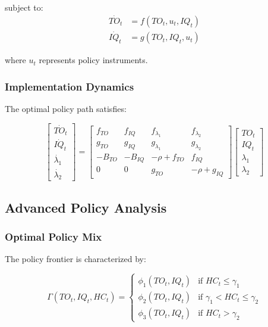 \documentclass[12pt,a4paper]{article}
\theoremstyle{definition}
\begin{document}
subject to:
\begin{align}
\dot{TO_t} &= f(TO_t, u_t, IQ_t) \\
\dot{IQ_t} &= g(TO_t, IQ_t, u_t)
\end{align}

where $u_t$ represents policy instruments.

\subsubsection{Implementation Dynamics}
The optimal policy path satisfies:

\begin{equation}
\begin{bmatrix}
\dot{TO_t} \\
\dot{IQ_t} \\
\dot{\lambda_1} \\
\dot{\lambda_2}
\end{bmatrix} = 
\begin{bmatrix}
f_{TO} & f_{IQ} & f_{\lambda_1} & f_{\lambda_2} \\
g_{TO} & g_{IQ} & g_{\lambda_1} & g_{\lambda_2} \\
-B_{TO} & -B_{IQ} & -\rho+f_{TO} & f_{IQ} \\
0 & 0 & g_{TO} & -\rho+g_{IQ}
\end{bmatrix}
\begin{bmatrix}
TO_t \\
IQ_t \\
\lambda_1 \\
\lambda_2
\end{bmatrix}
\end{equation}

\subsection{Advanced Policy Analysis}
\subsubsection{Optimal Policy Mix}
The policy frontier is characterized by:

\begin{equation}
\Gamma(TO_t, IQ_t, HC_t) = \begin{cases}
\phi_1(TO_t, IQ_t) & \text{if } HC_t \leq \gamma_1 \\
\phi_2(TO_t, IQ_t) & \text{if } \gamma_1 < HC_t \leq \gamma_2 \\
\phi_3(TO_t, IQ_t) & \text{if } HC_t > \gamma_2
\end{cases}
\end{equation}
\end{document}
